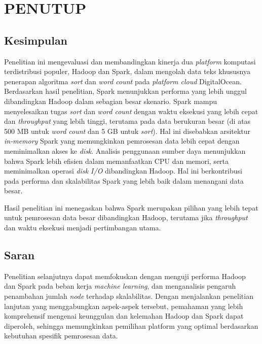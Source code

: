 \chapter{PENUTUP}

\section{Kesimpulan}
Penelitian ini mengevaluasi dan membandingkan kinerja dua \textit{platform} komputasi terdistribusi populer, Hadoop dan Spark, dalam mengolah data teks khususnya penerapan algoritma \textit{sort} dan \textit{word count} pada \textit{platform cloud} DigitalOcean. Berdasarkan hasil penelitian, Spark menunjukkan performa yang lebih unggul dibandingkan Hadoop dalam sebagian besar skenario. Spark mampu menyelesaikan tugas \textit{sort} dan \textit{word count} dengan waktu eksekusi yang lebih cepat dan \textit{throughput} yang lebih tinggi, terutama pada data berukuran besar (di atas 500 MB untuk \textit{word count} dan 5 GB untuk \textit{sort}). Hal ini disebabkan arsitektur \textit{in-memory} Spark yang memungkinkan pemrosesan data lebih cepat dengan meminimalkan akses ke \textit{disk}. Analisis penggunaan sumber daya menunjukkan bahwa Spark lebih efisien dalam memanfaatkan CPU dan memori, serta meminimalkan operasi \textit{disk I/O} dibandingkan Hadoop.  Hal ini berkontribusi pada performa dan skalabilitas Spark yang lebih baik dalam menangani data besar. 

Hasil penelitian ini menegaskan bahwa Spark merupakan pilihan yang lebih tepat untuk pemrosesan data besar dibandingkan Hadoop, terutama jika \textit{throughput} dan waktu eksekusi menjadi pertimbangan utama. 

\section{Saran}
Penelitian selanjutnya dapat memfokuskan dengan menguji performa Hadoop dan Spark pada beban kerja \textit{machine learning}, dan menganalisis pengaruh penambahan jumlah \textit{node} terhadap skalabilitas. Dengan menjalankan penelitian lanjutan yang menggabungkan aspek-aspek tersebut, pemahaman yang lebih komprehensif mengenai keunggulan dan kelemahan Hadoop dan Spark dapat diperoleh, sehingga memungkinkan pemilihan platform yang optimal berdasarkan kebutuhan spesifik pemrosesan data.
